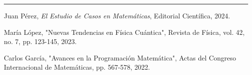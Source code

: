 \documentclass[a4paper, 10pt]{article}
\begin{document}
	\vspace{1em} %
	\hrule %
	\vspace{1em} %
	
	\renewcommand{\refname}{Referencias} %
	\begin{thebibliography}{9}
		Juan Pérez,
		\textit{El Estudio de Casos en Matemáticas},
		Editorial Científica, 2024.
		
		María López,
		"Nuevas Tendencias en Física Cuántica",
		Revista de Física, vol. 42, no. 7, pp. 123-145, 2023.
		
		Carlos García,
		"Avances en la Programación Matemática",
		Actas del Congreso Internacional de Matemáticas, pp. 567-578, 2022.
	\end{thebibliography}
	
\end{document}
